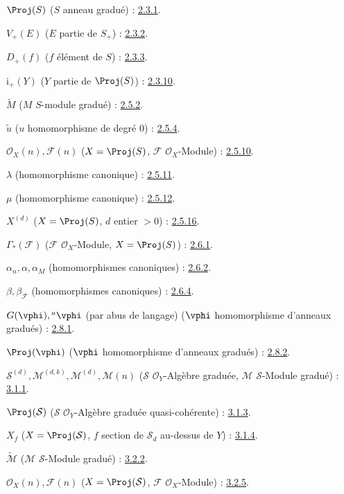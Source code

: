 $\Proj(S)$ ($S$ anneau gradué) : \hyperref[II.2.3.1-fr]{2.3.1}.

$V_+(E)$ ($E$ partie de $S_+$) : \hyperref[II.2.3.2-fr]{2.3.2}.

$D_+(f)$ ($f$ élément de $S$) : \hyperref[II.2.3.3-fr]{2.3.3}.

$\mathrm{i}_+(Y)$ ($Y$ partie de $\Proj(S)$) : \hyperref[II.2.3.10-fr]{2.3.10}.

$\widetilde M$ ($M$ $S$-module gradué) : \hyperref[II.2.5.2-fr]{2.5.2}.

$\widetilde u$ ($u$ homomorphisme de degré $0$) : \hyperref[II.2.5.4-fr]{2.5.4}.

$\mathcal{O}_X(n),\mathcal{F}(n)$
($X=\Proj(S)$, $\mathcal{F}$ $\mathcal{O}_X$-Module) : \hyperref[II.2.5.10-fr]{2.5.10}.

$\lambda$ (homomorphisme canonique) : \hyperref[II.2.5.11-fr]{2.5.11}.

$\mu$ (homomorphisme canonique) : \hyperref[II.2.5.12-fr]{2.5.12}.

$X^{(d)}$ ($X=\Proj(S)$, $d$ entier $>0$) : \hyperref[II.2.5.16-fr]{2.5.16}.

$\Gamma_*(\mathcal{F})$ ($\mathcal{F}$ $\mathcal{O}_X$-Module,
$X=\Proj(S)$) : \hyperref[II.2.6.1-fr]{2.6.1}.

$\alpha_n,\alpha,\alpha_M$ (homomorphismes canoniques) : \hyperref[II.2.6.2-fr]{2.6.2}.

$\beta,\beta_{\mathcal{F}}$ (homomorphismes canoniques) : \hyperref[II.2.6.4-fr]{2.6.4}.

$G(\vphi),{}^a\vphi$ (par abus de langage)
($\vphi$ homomorphisme d'anneaux gradués) : \hyperref[II.2.8.1-fr]{2.8.1}.

$\Proj(\vphi)$ ($\vphi$ homomorphisme d'anneaux gradués) : \hyperref[II.2.8.2-fr]{2.8.2}.

$\mathcal{S}^{(d)},\mathcal{M}^{(d,k)},\mathcal{M}^{(d)},\mathcal{M}(n)$
($\mathcal{S}$ $\mathcal{O}_Y$-Algèbre graduée,
$\mathcal{M}$ $\mathcal{S}$-Module gradué) : \hyperref[II.3.1.1-fr]{3.1.1}.

$\Proj(\mathcal{S})$ ($\mathcal{S}$ $\mathcal{O}_Y$-Algèbre graduée quasi-cohérente) : \hyperref[II.3.1.3-fr]{3.1.3}.

$X_f$ ($X=\Proj(\mathcal{S})$, $f$ section de $\mathcal{S}_d$ au-dessus de $Y$) : \hyperref[II.3.1.4-fr]{3.1.4}.

$\widetilde{\mathcal{M}}$ ($\mathcal{M}$ $\mathcal{S}$-Module gradué) : \hyperref[II.3.2.2-fr]{3.2.2}.

$\mathcal{O}_X(n),\mathcal{F}(n)$
($X=\Proj(\mathcal{S})$, $\mathcal{F}$ $\mathcal{O}_X$-Module) : \hyperref[II.3.2.5-fr]{3.2.5}.

